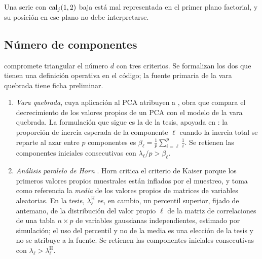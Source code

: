 Una serie con $\operatorname{cal}_j(1,2)$ baja está mal representada en el primer plano factorial, y su
posición en ese plano no debe interpretarse.

\subsection{Número de componentes}
\label{sec:retencion}

 compromete triangular el número $d$ con tres criterios. Se formalizan los dos
que tienen una definición operativa en el código; la fuente primaria de la vara quebrada tiene
ficha preliminar.

\begin{definicion}\label{def:retencion}
\begin{enumerate}[label=(\alph*)]
  \item \emph{Vara quebrada}, cuya aplicación al PCA \textcite{camiz_pillar_2018} atribuyen a
    \textcite{frontier_1976}, obra que compara el decrecimiento de los
    valores propios de un PCA con el modelo de la vara quebrada. La formulación que sigue es la de
    la tesis, apoyada en \textcite{camiz_pillar_2018}: la
    proporción de inercia esperada de la componente $\ell$ cuando la inercia total se reparte al
    azar entre $p$ componentes es $\beta_\ell=\frac1p\sum_{i=\ell}^{p}\frac1i$. Se retienen las
    componentes iniciales consecutivas con $\lambda_\ell/p>\beta_\ell$.
  \item \emph{Análisis paralelo de Horn} \parencite{horn_1965}. Horn critica el criterio de
    Kaiser porque los primeros valores propios muestrales están inflados por el muestreo, y toma
    como referencia la \emph{media} de los valores propios de matrices de variables aleatorias. En
    la tesis, $\lambda^{\mathrm H}_\ell$ es, en cambio, un percentil superior, fijado de antemano,
    de la distribución del valor propio $\ell$ de la matriz de correlaciones de una tabla
    $n\times p$ de variables gaussianas independientes, estimado por simulación; el uso del
    percentil y no de la media es una elección de la tesis y no se atribuye a la fuente. Se retienen las componentes iniciales consecutivas
    con $\lambda_\ell>\lambda^{\mathrm H}_\ell$.
\end{enumerate}
\end{definicion}

